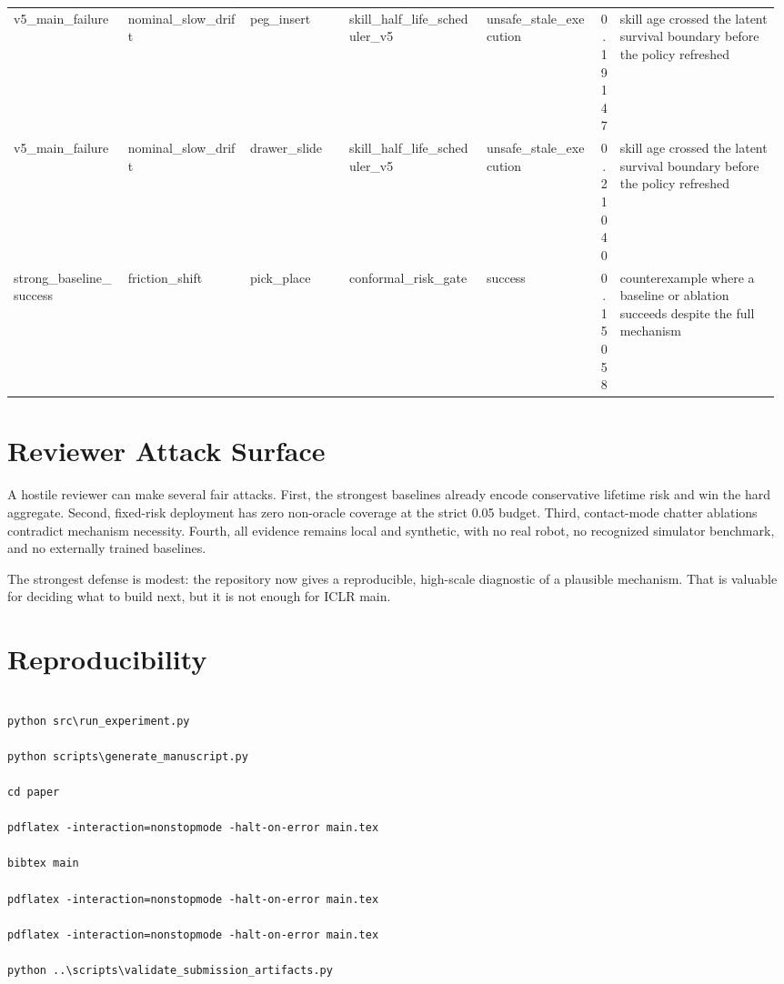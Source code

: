 \documentclass{article}
\begin{document}
\begin{center}
\begin{longtable}{p{0.15\linewidth}p{0.16\linewidth}p{0.13\linewidth}p{0.18\linewidth}p{0.15\linewidth}cp{0.21\linewidth}}
v5\_main\_failure & nominal\_slow\_drift & peg\_insert & skill\_half\_life\_scheduler\_v5 & unsafe\_stale\_execution & 0.19147 & skill age crossed the latent survival boundary before the policy refreshed\\
v5\_main\_failure & nominal\_slow\_drift & drawer\_slide & skill\_half\_life\_scheduler\_v5 & unsafe\_stale\_execution & 0.21040 & skill age crossed the latent survival boundary before the policy refreshed\\
strong\_baseline\_success & friction\_shift & pick\_place & conformal\_risk\_gate & success & 0.15058 & counterexample where a baseline or ablation succeeds despite the full mechanism\\
\bottomrule
\end{longtable}
\normalsize
\end{center}

\section{Reviewer Attack Surface}

A hostile reviewer can make several fair attacks. First, the strongest baselines already encode conservative lifetime risk and win the hard aggregate. Second, fixed-risk deployment has zero non-oracle coverage at the strict 0.05 budget. Third, contact-mode chatter ablations contradict mechanism necessity. Fourth, all evidence remains local and synthetic, with no real robot, no recognized simulator benchmark, and no externally trained baselines.

The strongest defense is modest: the repository now gives a reproducible, high-scale diagnostic of a plausible mechanism. That is valuable for deciding what to build next, but it is not enough for ICLR main.

\section{Reproducibility}

\begin{verbatim}

python src\run_experiment.py

python scripts\generate_manuscript.py

cd paper

pdflatex -interaction=nonstopmode -halt-on-error main.tex

bibtex main

pdflatex -interaction=nonstopmode -halt-on-error main.tex

pdflatex -interaction=nonstopmode -halt-on-error main.tex

python ..\scripts\validate_submission_artifacts.py

\end{verbatim}
\end{document}

